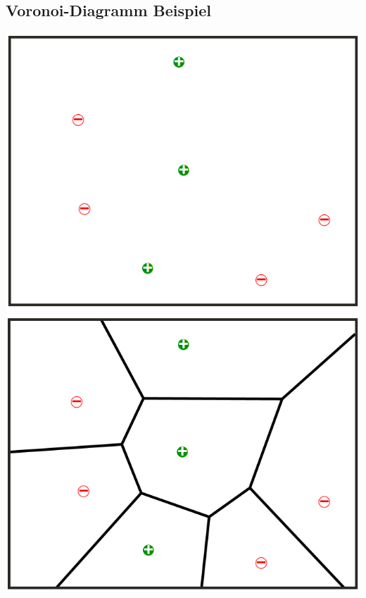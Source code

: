 \documentclass[a4paper]{scrartcl}
\begin{document}
\begin{multicols}{2}
                        \section{Voronoi-Diagramm Beispiel}
                        \includegraphics[width=\linewidth]{vor1.png}
                        \includegraphics[width=\linewidth]{vor2.png}

\end{multicols}
\end{document}
